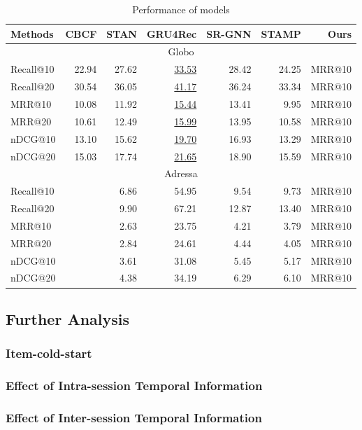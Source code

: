 \begin{table}[th]
  \caption{Performance of models}
  \label{performance-table}
  \centering
  \begin{tabular}{l|rr|rrrr}
    \toprule
     Methods & CBCF & STAN & GRU4Rec & SR-GNN & STAMP & Ours\\
    \midrule
    \multicolumn{7}{c}{Globo}\\
    \midrule
    Recall@10 & 22.94 & 27.62 & \underline{33.53} & 28.42 & 24.25  & MRR@10\\
    Recall@20 & 30.54 & 36.05 & \underline{41.17} & 36.24 & 33.34  & MRR@10 \\
    MRR@10    & 10.08 & 11.92 & \underline{15.44} & 13.41 & 9.95  & MRR@10\\
    MRR@20    & 10.61 & 12.49 & \underline{15.99} & 13.95 & 10.58  & MRR@10 \\
    nDCG@10   & 13.10 & 15.62 & \underline{19.70} & 16.93 & 13.29  & MRR@10 \\
    nDCG@20   & 15.03 & 17.74 & \underline{21.65} & 18.90 & 15.59  & MRR@10 \\
    \midrule
    \multicolumn{7}{c}{Adressa}\\
    \midrule
    Recall@10 &   & 6.86 & 54.95 & 9.54 & 9.73 &  MRR@10\\
    Recall@20 &   & 9.90 & 67.21 & 12.87 & 13.40 & MRR@10 \\
    MRR@10    &   & 2.63 & 23.75 & 4.21 & 3.79 & MRR@10\\
    MRR@20    &   & 2.84 & 24.61 & 4.44 & 4.05 & MRR@10 \\
    nDCG@10   &   & 3.61 & 31.08 & 5.45 & 5.17 & MRR@10 \\
    nDCG@20   &   & 4.38 & 34.19 & 6.29 & 6.10 & MRR@10 \\
    \bottomrule
  \end{tabular}
\end{table}

\subsection{Further Analysis}
\subsubsection{Item-cold-start}
\subsubsection{Effect of Intra-session Temporal Information}
\subsubsection{Effect of Inter-session Temporal Information}
